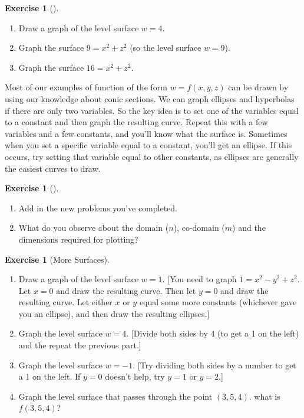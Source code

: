 \documentclass[10pt,]{book}
\theoremstyle{plain}
\theoremstyle{definition}
\theoremstyle{definition}
\theoremstyle{definition}
\theoremstyle{definition}
\newtheorem{exploration}[project]{Exercise}
\theoremstyle{definition}
\numberwithin{equation}{section}
\begin{document}
\begin{exploration}[]\label{exploration-115}
\leavevmode%
\begin{enumerate}[font=\bfseries,label=(\alph*),ref=\alph*]
\item\label{task-228} Draw a graph of the level surface \(w=4\).%
\item\label{task-229} Graph the surface \(9=x^2+z^2\) (so the level surface \(w=9\)).%
\item\label{task-230} Graph the surface \(16=x^2+z^2\).%
\end{enumerate}
\end{exploration}
Most of our examples of function of the form \(w=f(x,y,z)\) can be drawn by using our knowledge about conic sections. We can graph ellipses and hyperbolas if there are only two variables. So the key idea is to set one of the variables equal to a constant and then graph the resulting curve. Repeat this with a few variables and a few constants, and you'll know what the surface is. Sometimes when you set a specific variable equal to a constant, you'll get an ellipse. If this occurs, try setting that variable equal to other constants, as ellipses are generally the easiest curves to draw.%
\begin{exploration}[]\label{exploration-116}
\leavevmode%
\begin{enumerate}[font=\bfseries,label=(\alph*),ref=\alph*]
\item\label{task-231} Add in the new problems you've completed.%
\item\label{task-232} What do you observe about the domain (\(n\)), co-domain (\(m\)) and the dimensions required for plotting?%
\end{enumerate}
\end{exploration}
\begin{exploration}[More Surfaces]\label{exploration-117}
\leavevmode%
\begin{enumerate}[font=\bfseries,label=(\alph*),ref=\alph*]
\item\label{task-233} Draw a graph of the level surface \(w=1\). [You need to graph \(1=x^2-y^2+z^2\). Let \(x=0\) and draw the resulting curve. Then let \(y=0\) and draw the resulting curve. Let either \(x\) or \(y\) equal some more constants (whichever gave you an ellipse), and then draw the resulting ellipses.]%
\item\label{task-234} Graph the level surface \(w=4\). [Divide both sides by \(4\) (to get a 1 on the left) and the repeat the previous part.]%
\item\label{task-235} Graph the level surface \(w=-1\). [Try dividing both sides by a number to get a 1 on the left. If \(y=0\) doesn't help, try \(y=1\) or \(y=2\).]%
\item\label{task-236} Graph the level surface that passes through the point \((3,5,4)\). what is \(f(3,5,4)\)?%
%
\end{enumerate}
\end{exploration}
\typeout{************************************************}
\typeout{************************************************}
\end{document}
